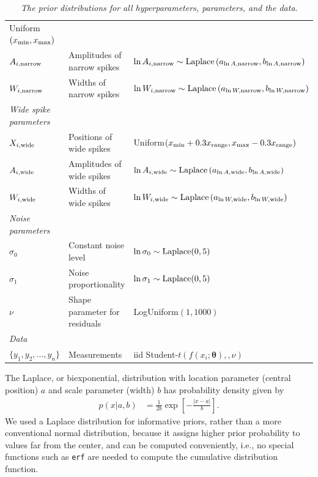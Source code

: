 \documentclass[a4paper, 12pt]{article}
\newcommand{\params}{\boldsymbol{\theta}}
\begin{document}
\begin{landscape}
\begin{table}
\begin{tabular}{|lll|}
                            Uniform$(x_{\rm min}, x_{\rm max})$ \\
$A_{i, \rm narrow}$ & Amplitudes of narrow spikes &
 $\ln A_{i, \rm narrow} \sim \textnormal{Laplace}\left(a_{\ln A, \rm narrow}, b_{\ln A, \rm narrow}\right)$ \\
$W_{i, \rm narrow}$ & Widths of narrow spikes &
 $\ln W_{i, \rm narrow} \sim \textnormal{Laplace}\left(a_{\ln W, \rm narrow}, b_{\ln W, \rm narrow}\right)$ \\
\hline
{\em Wide spike parameters}&&\\
$X_{i, \rm wide}$ & Positions of wide spikes &
          Uniform$(x_{\rm min}+0.3x_{\rm range}, x_{\rm max}-0.3x_{\rm range})$ \\
$A_{i, \rm wide}$ & Amplitudes of wide spikes &
 $\ln A_{i, \rm wide} \sim \textnormal{Laplace}\left(a_{\ln A, \rm wide}, b_{\ln A, \rm wide}\right)$ \\
$W_{i, \rm wide}$ & Widths of wide spikes &
 $\ln W_{i, \rm wide} \sim \textnormal{Laplace}\left(a_{\ln W, \rm wide}, b_{\ln W, \rm wide}\right)$ \\
\hline
{\em Noise parameters}&&\\
$\sigma_0$ &    Constant noise level  &   $\ln \sigma_0 \sim \textnormal{Laplace}(0,5)$\\
$\sigma_1$ &    Noise proportionality   &  $\ln \sigma_1 \sim \textnormal{Laplace}(0,5)$ \\
$\nu$     &   Shape parameter for residuals   &   LogUniform$(1, 1000)$\\
\hline
{\em Data}&&\\
\hline
$\{y_1, y_2, ..., y_n\}$  &   Measurements    & iid Student-$t(f(x_i; \params), ,\nu)$\\
\hline
\end{tabular}
\caption{\it The prior distributions for all hyperparameters,
parameters, and the data.\label{tab:priors}}
\end{table}

\end{landscape}

The Laplace, or biexponential, distribution with location parameter
(central position) $a$ and scale parameter (width) $b$ has probability
density given by
\begin{align}
p(x | a, b) &= \frac{1}{2b}\exp\left[-\frac{|x - a|}{b}\right].
\end{align}
We used a Laplace distribution for informative priors, rather than
a more conventional normal distribution, because it assigns higher
prior probability to values far from the center, and can be computed conveniently, i.e., no special functions such as {\tt erf} are needed
to compute the cumulative distribution function.
\end{document}
